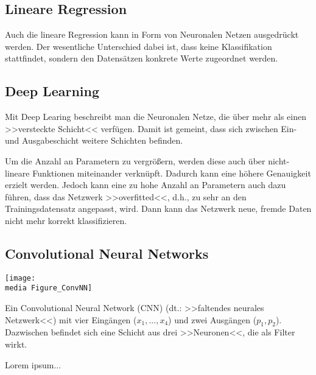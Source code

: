\subsection{Lineare Regression}

Auch die lineare Regression kann in Form von Neuronalen Netzen ausgedrückt werden. Der wesentliche Unterschied dabei ist, dass keine Klassifikation stattfindet, sondern den Datensätzen konkrete Werte zugeordnet werden.


\subsection{Deep Learning}

Mit Deep Learing beschreibt man die Neuronalen Netze, die über mehr als einen >>versteckte Schicht<< verfügen. Damit ist gemeint, dass sich zwischen Ein- und Ausgabeschicht weitere Schichten befinden. 

Um die Anzahl an Parametern zu vergrößern, werden diese auch über nicht-lineare Funktionen miteinander verknüpft. Dadurch kann eine höhere Genauigkeit erzielt werden. Jedoch kann eine zu hohe Anzahl an Parametern auch dazu führen, dass das Netzwerk >>overfitted<<, d.h., zu sehr an den Trainingsdatensatz angepasst, wird. Dann kann das Netzwerk neue, fremde Daten nicht mehr korrekt klassifizieren.

\subsection{Convolutional Neural Networks}

\begin{dsafigure}
	\begin{center}
		\texttt{[image: \\media Figure\_ConvNN]}
		\caption{Ein Convolutional Neural Network (CNN) (dt.: >>faltendes neurales Netzwerk<<) mit vier Eingängen ($x_1, ..., x_4$) und zwei Ausgängen ($p_1, p_2$). Dazwischen befindet sich eine Schicht aus drei >>Neuronen<<, die als Filter wirkt.}
		\label{FigConvNN}
	\end{center}
\end{dsafigure}

Lorem ipsum...